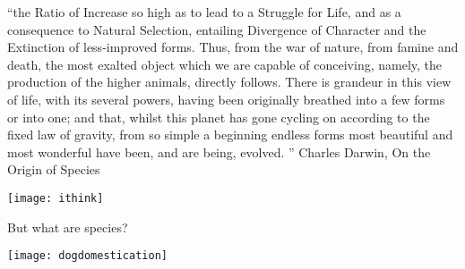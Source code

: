 \documentclass{beamer}
\begin{document}




\begin{frame}
``the Ratio of Increase so high as to lead to a Struggle for Life, and as a consequence to Natural Selection, entailing Divergence of Character and the Extinction of less-improved forms. 
Thus, from the war of nature, from famine and death, the most exalted object which we are capable of conceiving, namely, the production of the higher animals, directly follows. 
There is grandeur in this view of life, with its several powers, having been originally breathed into a few forms or into one; 
 and that, whilst this planet has gone cycling on according to the fixed law of gravity, 
 from so simple a beginning endless forms most beautiful and most wonderful have been, and are being, evolved. ''
 Charles Darwin, On the Origin of Species
\end{frame}

\begin{frame}
\begin{center}
\centerline{\texttt{[image: ithink]}}
\end{center}
\end{frame}


\begin{frame}
 \Large{But what are species?}
\end{frame}



\begin{frame}
\begin{center}
\centerline{\texttt{[image: dogdomestication]}}
\end{center}
\end{frame}




\end{document}
